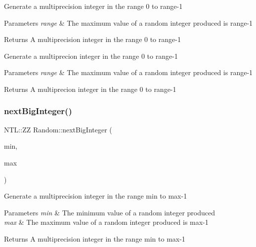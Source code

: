 Generate a multiprecision integer in the range 0 to {\ttfamily range-\/1} 
\begin{DoxyParams}{Parameters}
{\em range} & The maximum value of a random integer produced is {\ttfamily range-\/1} \\
\hline
\end{DoxyParams}
\begin{DoxyReturn}{Returns}
A multiprecision integer in the range 0 to {\ttfamily range-\/1} 
\end{DoxyReturn}
Generate a multiprecion integer in the range 0 to {\ttfamily range-\/1} 
\begin{DoxyParams}{Parameters}
{\em range} & The maximum value of a random integer produced is {\ttfamily range-\/1} \\
\hline
\end{DoxyParams}
\begin{DoxyReturn}{Returns}
A multiprecion integer in the range 0 to {\ttfamily range-\/1} 
\end{DoxyReturn}
\mbox{\label{classRandom_a1d267162c75edb3792dcf29f3125f265}} 
\subsubsection{\texorpdfstring{next\+Big\+Integer()}{nextBigInteger()}\hspace{0.1cm}{\footnotesize\ttfamily [2/2]}}
{\footnotesize\ttfamily N\+T\+L\+::\+ZZ Random\+::next\+Big\+Integer (\begin{DoxyParamCaption}\item[{N\+T\+L\+::\+ZZ \&}]{min,  }\item[{N\+T\+L\+::\+ZZ \&}]{max }\end{DoxyParamCaption})}

Generate a multiprecision integer in the range {\ttfamily min} to {\ttfamily max-\/1} 
\begin{DoxyParams}{Parameters}
{\em min} & The minimum value of a random integer produced \\
\hline
{\em max} & The maximum value of a random integer produced is {\ttfamily max-\/1} \\
\hline
\end{DoxyParams}
\begin{DoxyReturn}{Returns}
A multiprecision integer in the range {\ttfamily min} to {\ttfamily max-\/1} 
\end{DoxyReturn}


